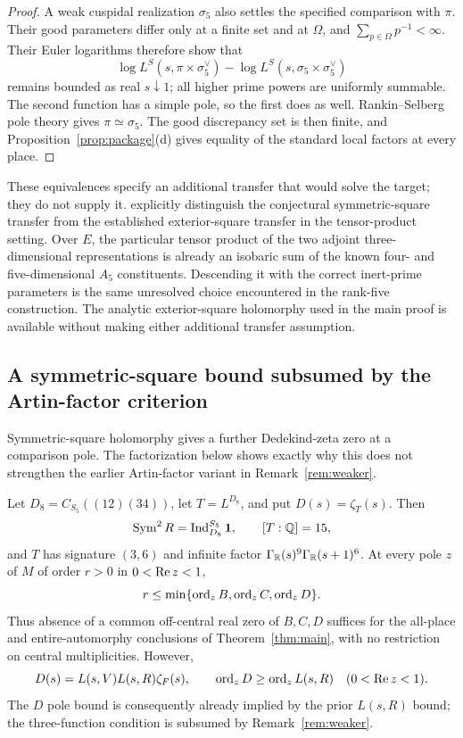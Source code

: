 \begin{proof}
A weak cuspidal realization $\sigma_5$ also settles the specified comparison with $\pi$. Their good parameters differ only at a finite set and at $\Omega$, and $\sum_{p\in\Omega}p^{-1}<\infty$. Their Euler logarithms therefore show that
\[
\log L^S(s,\pi\times\sigma_5^\vee)
-\log L^S(s,\sigma_5\times\sigma_5^\vee)
\]
remains bounded as real $s\downarrow1$; all higher prime powers are uniformly summable. The second function has a simple pole, so the first does as well. Rankin--Selberg pole theory gives $\pi\simeq\sigma_5$. The good discrepancy set is then finite, and Proposition~\ref{prop:package}(d) gives equality of the standard local factors at every place.
\end{proof}

These equivalences specify an additional transfer that would solve the target; they do not supply it. \citet[Proposition 3.1(b)]{asgariraghuram} explicitly distinguish the conjectural symmetric-square transfer from the established exterior-square transfer in the tensor-product setting. Over $E$, the particular tensor product of the two adjoint three-dimensional representations is already an isobaric sum of the known four- and five-dimensional $A_5$ constituents. Descending it with the correct inert-prime parameters is the same unresolved choice encountered in the rank-five construction. The analytic exterior-square holomorphy used in the main proof is available without making either additional transfer assumption.

\subsection{A symmetric-square bound subsumed by the Artin-factor criterion}

Symmetric-square holomorphy gives a further Dedekind-zeta zero at a comparison pole. The factorization below shows exactly why this does not strengthen the earlier Artin-factor variant in Remark~\ref{rem:weaker}.

\begin{proposition}\label{prop:symmetric-square-redundancy}
Let $D_8=C_{S_5}((12)(34))$, let $T=L^{D_8}$, and put $D(s)=\zeta_T(s)$. Then
\[
\operatorname{Sym}^2R=\operatorname{Ind}_{D_8}^{S_5}\mathbf 1,\qquad [T:\mathbb Q]=15,
\]
and $T$ has signature $(3,6)$ and infinite factor $\Gamma_{\mathbb R}(s)^9\Gamma_{\mathbb R}(s+1)^6$.
At every pole $z$ of $M$ of order $r>0$ in $0<\operatorname{Re} z<1$,
\[
r\leq\min\{\operatorname{ord}_zB,\operatorname{ord}_zC,\operatorname{ord}_zD\}.
\]
Thus absence of a common off-central real zero of $B,C,D$ suffices for the all-place and entire-automorphy conclusions of Theorem~\ref{thm:main}, with no restriction on central multiplicities. However,
\begin{equation}\label{eq:symmetric-square-redundancy}
D(s)=L(s,V)L(s,R)\zeta_F(s),\qquad
\operatorname{ord}_zD\geq\operatorname{ord}_zL(s,R)\quad(0<\operatorname{Re} z<1).
\end{equation}
The $D$ pole bound is consequently already implied by the prior $L(s,R)$ bound; the three-function condition is subsumed by Remark~\ref{rem:weaker}.
\end{proposition}

